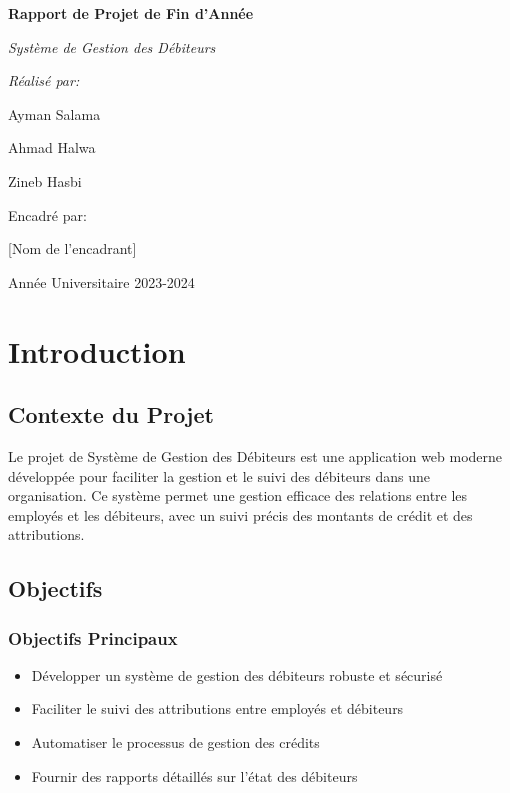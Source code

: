 \documentclass[12pt,a4paper]{report}
\begin{document}
\begin{titlepage}
    \centering
    \vspace*{2cm}
    {\Huge\bfseries Rapport de Projet de Fin d'Année\par}
    \vspace{1.5cm}
    {\Large\itshape Système de Gestion des Débiteurs\par}
    \vspace{2cm}
    {\Large\itshape Réalisé par:\par}
    \vspace{0.5cm}
    {\Large Ayman Salama\par}
    {\Large Ahmad Halwa\par}
    {\Large Zineb Hasbi\par}
    \vspace{2cm}
    {\large Encadré par:\par}
    {\large [Nom de l'encadrant]\par}
    \vfill
    {\large Année Universitaire 2023-2024\par}
\end{titlepage}

\tableofcontents
\newpage

\chapter{Introduction}
\section{Contexte du Projet}
Le projet de Système de Gestion des Débiteurs est une application web moderne développée pour faciliter la gestion et le suivi des débiteurs dans une organisation. Ce système permet une gestion efficace des relations entre les employés et les débiteurs, avec un suivi précis des montants de crédit et des attributions.

\section{Objectifs}
\subsection{Objectifs Principaux}
\begin{itemize}
    \item Développer un système de gestion des débiteurs robuste et sécurisé
    \item Faciliter le suivi des attributions entre employés et débiteurs
    \item Automatiser le processus de gestion des crédits
    \item Fournir des rapports détaillés sur l'état des débiteurs
\end{itemize}
\end{document}
